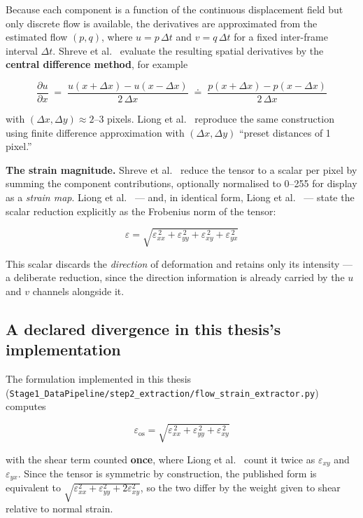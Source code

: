 Because each component is a function of the continuous displacement field but only discrete flow is available, the derivatives are approximated from the estimated flow $(p, q)$, where $u = p\,\Delta t$ and $v = q\,\Delta t$ for a fixed inter-frame interval $\Delta t$. Shreve et al.~\cite{shreve2011} evaluate the resulting spatial derivatives by the \textbf{central difference method}, for example

\[
	\frac{\partial u}{\partial x} \;=\; \frac{u(x + \Delta x) - u(x - \Delta x)}{2\,\Delta x} \;\doteq\; \frac{p(x + \Delta x) - p(x - \Delta x)}{2\,\Delta x}
\]

with $(\Delta x, \Delta y) \approx 2$--3 pixels. Liong et al.~\cite{liong2014a} reproduce the same construction using finite difference approximation with $(\Delta x, \Delta y)$ ``preset distances of 1 pixel.''

\textbf{The strain magnitude.} Shreve et al.~\cite{shreve2011} reduce the tensor to a scalar per pixel by summing the component contributions, optionally normalised to 0--255 for display as a \textit{strain map}. Liong et al.~\cite{liong2014a} --- and, in identical form, Liong et al.~\cite{liong2014b} --- state the scalar reduction explicitly as the Frobenius norm of the tensor:

\[
	\varepsilon = \sqrt{\varepsilon_{xx}^{\,2} + \varepsilon_{yy}^{\,2} + \varepsilon_{xy}^{\,2} + \varepsilon_{yx}^{\,2}}
\]

This scalar discards the \textit{direction} of deformation and retains only its intensity --- a deliberate reduction, since the direction information is already carried by the $u$ and $v$ channels alongside it.

\subsection{A declared divergence in this thesis's implementation}
\label{sec:strain-divergence}

The formulation implemented in this thesis (\texttt{Stage1\_DataPipeline/step2\_extraction/flow\_strain\_extractor.py}) computes

\[
	\varepsilon_{\text{os}} = \sqrt{\varepsilon_{xx}^{\,2} + \varepsilon_{yy}^{\,2} + \varepsilon_{xy}^{\,2}}
\]

with the shear term counted \textbf{once}, where Liong et al.~\cite{liong2014a} count it twice as $\varepsilon_{xy}$ and $\varepsilon_{yx}$. Since the tensor is symmetric by construction, the published form is equivalent to $\sqrt{\varepsilon_{xx}^2 + \varepsilon_{yy}^2 + 2\varepsilon_{xy}^2}$, so the two differ by the weight given to shear relative to normal strain.

